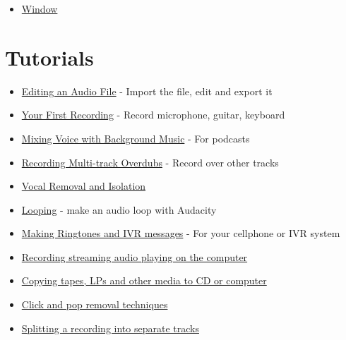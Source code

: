 \begin{multicols}{2}
\begin{itemize}
\item 
\hyperref[\foo{man_window_menu_}]{Window}

\end{itemize}

\label{index_ref_bottom}
\label{index_skiptheimage}
\label{index_tutorials}
\section{Tutorials}
\begin{itemize}
\item 
\hyperref[\foo{man_tutorial_editing_an_existing_file_}]{Editing an Audio File}
 - Import the file, edit and export it
\item 
\hyperref[\foo{man_tutorial_your_first_recording_}]{Your First Recording}
 - Record microphone, guitar, keyboard
\item 
\hyperref[\foo{man_tutorial_mixing_a_narration_with_background_music_}]{Mixing Voice with Background Music}
 - For podcasts
\item 
\hyperref[\foo{man_tutorial_recording_multi_track_overdubs_}]{Recording Multi-track Overdubs}
 - Record over other tracks
\item 
\hyperref[\foo{man_tutorial_vocal_removal_and_isolation_}]{Vocal Removal and Isolation}

\item 
\hyperref[\foo{man_tutorial_looping_}]{Looping}
 - make an audio loop with Audacity
\item 
\hyperref[\foo{man_tutorial_making_ringtones_and_ivr_messages_}]{Making Ringtones and IVR messages}
 - For your cellphone or IVR system
\item 
\hyperref[\foo{man_tutorial_recording_audio_playing_on_the_computer_}]{Recording streaming audio playing on the computer}

\end{itemize}

\begin{itemize}
\item 
\hyperref[\foo{man_tutorial_copying_tapes_lps_or_minidiscs_to_cd_}]{Copying tapes, LPs and other media to CD or computer}

\item 
\hyperref[\foo{man_tutorial_click_and_pop_removal_techniques_}]{Click and pop removal techniques}

\item 
\hyperref[\foo{man_splitting_a_recording_into_separate_tracks_}]{Splitting a recording into separate tracks}


\end{itemize}
\end{multicols}
